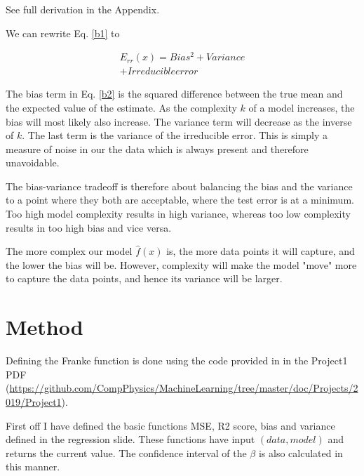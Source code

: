 \documentclass[a4paper,11pt,twocolumn]{article}
\begin{document}
See full derivation\cite{wiki} in the Appendix.  


We can rewrite Eq. \eqref{b1} to 

\begin{equation}
\label{b2}
\begin{multlined}
E_{rr}(x)=Bias^2+Variance\\+Irreducibleerror
\end{multlined}
\end{equation}


The bias term in Eq. \eqref{b2} is the squared difference between the true mean and the expected value of the estimate. As the complexity $k$ of a model increases, the bias will most likely also increase. The variance term will decrease as the inverse of $k$. The last term is the variance of the irreducible error. This is simply a measure of noise in our the data which is always present and therefore unavoidable.  

The bias-variance tradeoff is therefore about balancing the bias and the variance to a point where they both are acceptable, where the test error is at a minimum. Too high model complexity results in high variance, whereas too low complexity results in too high bias and vice versa.\cite{Hastie}


The more complex our model $\hat{f}(x)$ is, the more data points it will capture, and the lower the bias will be. However, complexity will make the model "move" more to capture the data points, and hence its variance will be larger\cite{wiki}.

\section{Method}

Defining the Franke function is done using the code provided in in the Project1 PDF (\url{https://github.com/CompPhysics/MachineLearning/tree/master/doc/Projects/2019/Project1}).

First off I have defined the basic functions MSE, R2 score, bias and variance defined in the regression slide\cite{slides}. These functions have input $(data,model)$ and returns the current value. The confidence interval of the $\beta$ is also calculated in this manner. 
\end{document}
